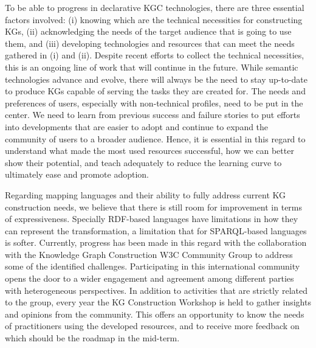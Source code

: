 



To be able to progress in declarative KGC technologies, there are three essential factors involved: (i) knowing which are the technical necessities for constructing KGs, (ii) acknowledging the needs of the target audience that is going to use them, and (iii) developing technologies and resources that can meet the needs gathered in (i) and (ii). 
Despite recent efforts to collect the technical necessities, this is an ongoing line of work that will continue in the future. While semantic technologies advance and evolve, there will always be the need to stay up-to-date to produce KGs capable of serving the tasks they are created for. The needs and preferences of users, especially with non-technical profiles, need to be put in the center. We need to learn from previous success and failure stories to put efforts into developments that are easier to adopt and continue to expand the community of users to a broader audience. Hence, it is essential in this regard to understand what made the most used resources successful, how we can better show their potential, and teach adequately to reduce the learning curve to ultimately ease and promote adoption. %

Regarding mapping languages and their ability to fully address current KG construction needs, we believe that there is still room for improvement in terms of expressiveness. Specially RDF-based languages have limitations in how they can represent the transformation, a limitation that for SPARQL-based languages is softer. Currently, progress has been made in this regard with the collaboration with the Knowledge Graph Construction W3C Community Group to address some of the identified challenges. 
Participating in this international community opens the door to a wider engagement and agreement among different parties with heterogeneous perspectives. 
In addition to activities that are strictly related to the group, every year the KG Construction Workshop is held to gather insights and opinions from the community.
This offers an opportunity to know the needs of practitioners using the developed resources, and to receive more feedback on which should be the roadmap in the mid-term.  


